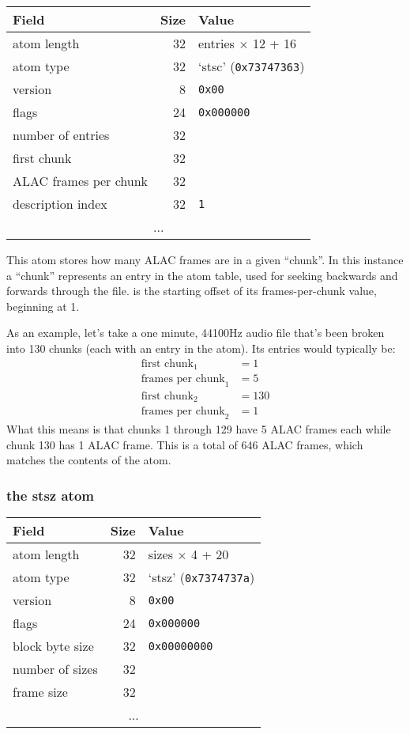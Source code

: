 \begin{table}[h]
\begin{tabular}{|l|r|l|}
\hline
Field & Size & Value \\
\hline
atom length & 32 & entries $\times$ 12 + 16 \\
atom type & 32 & `stsc' (\texttt{0x73747363}) \\
\hline
version & 8 & \texttt{0x00} \\
flags & 24 & \texttt{0x000000} \\
number of entries & 32 & \\
\hline
first chunk & 32 & \\
ALAC frames per chunk & 32 & \\
description index & 32 & \texttt{1} \\
\hline
\multicolumn{3}{|c|}{...} \\
\hline
\end{tabular}
\end{table}

This atom stores how many ALAC frames are in a given ``chunk''.
In this instance a ``chunk'' represents an entry in
the  atom table, used for seeking backwards and forwards
through the file.
 is the starting offset of its frames-per-chunk
value, beginning at 1.

As an example, let's take a one minute, 44100Hz audio file
that's been broken into 130 chunks
(each with an entry in the  atom).
Its  entries would typically be:
\begin{align*}
\text{first chunk}_1 &= 1 \\
\text{frames per chunk}_1 &= 5 \\
\text{first chunk}_2 &= 130 \\
\text{frames per chunk}_2 &= 1
\end{align*}
What this means is that chunks 1 through 129 have 5 ALAC frames each
while chunk 130 has 1 ALAC frame.
This is a total of 646 ALAC frames, which matches the contents of
the  atom.

\subsubsection{the stsz atom}

\begin{tabular}{|l|r|l|}
\hline
Field & Size & Value \\
\hline
atom length & 32 & sizes $\times$ 4 + 20 \\
atom type & 32 & `stsz' (\texttt{0x7374737a}) \\
\hline
version & 8 & \texttt{0x00} \\
flags & 24 & \texttt{0x000000} \\
block byte size & 32 & \texttt{0x00000000} \\
number of sizes & 32 & \\
\hline
frame size & 32 & \\
\hline
\multicolumn{3}{|c|}{...} \\
\hline
\end{tabular}

